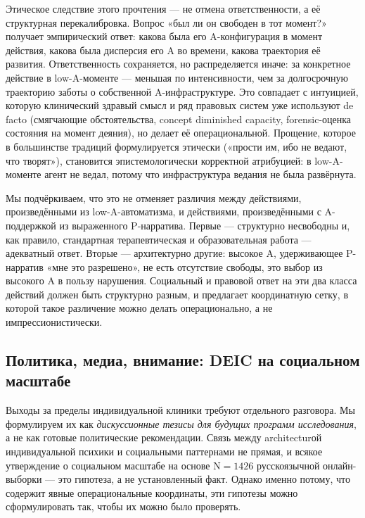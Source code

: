 Этическое следствие этого прочтения --- не отмена ответственности, а её структурная перекалибровка. Вопрос «был ли он свободен в тот момент?» получает эмпирический ответ: какова была его A-конфигурация в момент действия, какова была дисперсия его A во времени, какова траектория её развития. Ответственность сохраняется, но распределяется иначе: за конкретное действие в low-A-моменте --- меньшая по интенсивности, чем за долгосрочную траекторию заботы о собственной A-инфраструктуре. Это совпадает с интуицией, которую клинический здравый смысл и ряд правовых систем уже используют de facto (смягчающие обстоятельства, concept diminished capacity, forensic-оценка состояния на момент деяния), но делает её операциональной. Прощение, которое в большинстве традиций формулируется этически («прости им, ибо не ведают, что творят»), становится эпистемологически корректной атрибуцией: в low-A-моменте агент не ведал, потому что инфраструктура ведания не была развёрнута.

Мы подчёркиваем, что это не отменяет различия между действиями, произведёнными из low-A-автоматизма, и действиями, произведёнными с A-поддержкой из выраженного P-нарратива. Первые --- структурно несвободны и, как правило, стандартная терапевтическая и образовательная работа --- адекватный ответ. Вторые --- архитектурно другие: высокое A, удерживающее P-нарратив «мне это разрешено», не есть отсутствие свободы, это выбор из высокого A в пользу нарушения. Социальный и правовой ответ на эти два класса действий должен быть структурно разным, и \DEIC{} предлагает координатную сетку, в которой такое различение можно делать операционально, а не импрессионистически.

\subsection{Политика, медиа, внимание: DEIC на социальном масштабе}
\label{subsec:political}

Выходы \DEIC{} за пределы индивидуальной клиники требуют отдельного разговора. Мы формулируем их как \emph{дискуссионные тезисы для будущих программ исследования}, а не как готовые политические рекомендации. Связь между architecturой индивидуальной психики и социальными паттернами не прямая, и всякое утверждение о социальном масштабе на основе N$=1426$ русскоязычной онлайн-выборки --- это гипотеза, а не установленный факт. Однако именно потому, что \DEIC{} содержит явные операциональные координаты, эти гипотезы можно сформулировать так, чтобы их можно было проверять.

